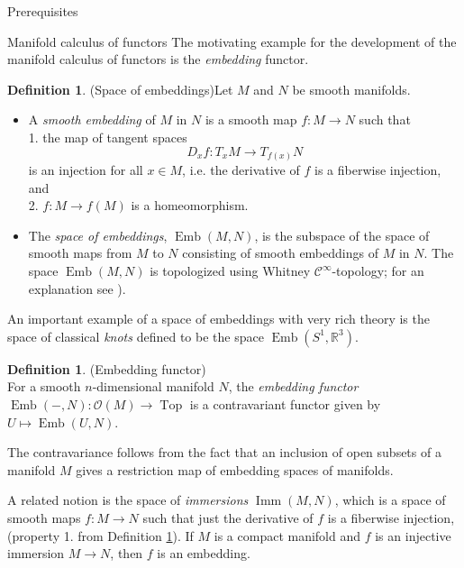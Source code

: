 \documentclass[12pt]{amsart}
\newcommand{\R}{{\mathbb R}}
\newcommand{\Emb}{\operatorname{Emb}}
\newcommand{\Imm}{\operatorname{Imm}}
\newcommand{\Conf}{\operatorname{Conf}}
\newcommand{\Top}{\operatorname{Top}}
\theoremstyle{plain}
\theoremstyle{definition}
\newtheorem{defin}[thm]{Definition}
\theoremstyle{remark}
\begin{document}
\begin{section}{Prerequisites}
\begin{subsection}{Manifold calculus of functors}
The motivating example for the development of the manifold calculus of functors is the \textit{embedding} functor.
\begin{defin}(Space of embeddings)\label{D:embed} Let $M$ and $N$ be smooth manifolds.
\begin{itemize}
\item{A \textit{smooth embedding} of $M$ in $N$ is a smooth map $f:M \rightarrow N$ such that\\
1. the map of tangent spaces $$D_x f: T_x M \rightarrow T_{f(x)}N$$
\hspace*{0.47cm}is an injection for all $x \in M$, i.e. the derivative of $f$ is a fiberwise injection, and\\
2. $f: M \rightarrow f(M)$ is a homeomorphism.}\\
\item{The \textit{space of embeddings}, $\Emb(M,N)$, is the subspace of the space of smooth maps from $M$ to $N$ consisting of smooth embeddings of $M$ in $N$. The space $\Emb(M,N)$ is topologized using Whitney $\mathcal{C}^{\infty}$-topology; for an explanation see \cite[Appendix A.2.2]{MV:Cubes}).}
\end{itemize}
\end{defin}
An important example of a space of embeddings with very rich theory is the space of classical \textit{knots} defined to be the space $\Emb(S^1,\R^3)$. 
\begin{defin}(Embedding functor)\\
For a smooth $n$-dimensional manifold $N$, the \textit{embedding functor} $\Emb(-,N) : \mathcal{O}(M) \to \Top$ is a contravariant functor given by $U \mapsto \Emb(U,N)$.
\end{defin}
The contravariance follows from the fact that an inclusion of open subsets of a manifold $M$ gives a restriction map of embedding spaces of manifolds.

A related notion is the space of \textit{immersions} $\Imm(M,N)$, which is a space of smooth maps $f:M \rightarrow N$ such that just the derivative of $f$ is a fiberwise injection, (property 1. from Definition \ref{D:embed}). If $M$ is a compact manifold and $f$ is an injective immersion $M \rightarrow N$, then $f$ is an embedding.


\end{subsection}
\end{section}
\end{document}

